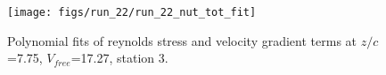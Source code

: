 \begin{figure}[H]
\centering
\texttt{[image: figs/run\_22/run\_22\_nut\_tot\_fit]}
\caption{Polynomial fits of reynolds stress and velocity gradient terms at $z/c$=7.75, $V_{free}$=17.27, station 3.}
\label{fig:run_22_nut_tot_fit}
\end{figure}


